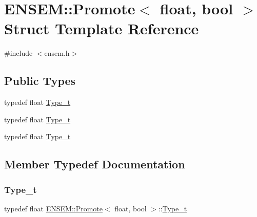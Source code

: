 \hypertarget{structENSEM_1_1Promote_3_01float_00_01bool_01_4}{}\section{E\+N\+S\+EM\+:\+:Promote$<$ float, bool $>$ Struct Template Reference}
\label{structENSEM_1_1Promote_3_01float_00_01bool_01_4}


{\ttfamily \#include $<$ensem.\+h$>$}

\subsection*{Public Types}
\begin{DoxyCompactItemize}
\item 
typedef float \mbox{\hyperlink{structENSEM_1_1Promote_3_01float_00_01bool_01_4_a6f3eae0e5a64ff95586a8924ebccb856}{Type\+\_\+t}}
\item 
typedef float \mbox{\hyperlink{structENSEM_1_1Promote_3_01float_00_01bool_01_4_a6f3eae0e5a64ff95586a8924ebccb856}{Type\+\_\+t}}
\item 
typedef float \mbox{\hyperlink{structENSEM_1_1Promote_3_01float_00_01bool_01_4_a6f3eae0e5a64ff95586a8924ebccb856}{Type\+\_\+t}}
\end{DoxyCompactItemize}


\subsection{Member Typedef Documentation}
\mbox{\label{structENSEM_1_1Promote_3_01float_00_01bool_01_4_a6f3eae0e5a64ff95586a8924ebccb856}} 
\subsubsection{\texorpdfstring{Type\_t}{Type\_t}\hspace{0.1cm}{\footnotesize\ttfamily [1/3]}}
{\footnotesize\ttfamily typedef float \mbox{\hyperlink{structENSEM_1_1Promote}{E\+N\+S\+E\+M\+::\+Promote}}$<$ float, bool $>$\+::\mbox{\hyperlink{structENSEM_1_1Promote_3_01float_00_01bool_01_4_a6f3eae0e5a64ff95586a8924ebccb856}{Type\+\_\+t}}}

